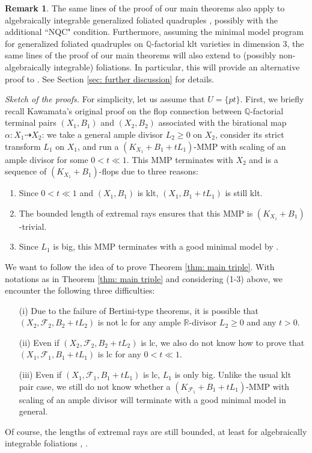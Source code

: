 \documentclass[11pt]{amsart}
\numberwithin{equation}{section}
\newcommand{\Qq}{\mathbb{Q}}
\newcommand{\Rr}{\mathbb{R}}
\newcommand{\Ff}{\mathcal{F}}
\theoremstyle{definition}
\theoremstyle{definition}
\newtheorem{rem}[thm]{Remark}
\theoremstyle{definition}
\begin{document}
\begin{rem}
The same lines of the proof of our main theorems also apply to algebraically integrable generalized foliated quadruples \cite[Definition 1.2]{LLM23}, possibly with the additional ``NQC" condition. Furthermore, assuming the minimal model program for generalized foliated quadruples on $\Qq$-factorial klt varieties in dimension 3, the same lines of the proof of our main theorems will also extend to (possibly non-algebraically integrable) foliations. In particular, this will provide an alternative proof to \cite[Theorem 1.1]{JV23}. See Section \ref{sec: further discussion} for details. 
\end{rem}



\medskip

\noindent\textit{Sketch of the proofs.} For simplicity, let us assume that $U=\{pt\}$. First, we briefly recall Kawamata's original proof \cite[Theorem 1]{Kaw08} on the flop connection between $\Qq$-factorial terminal pairs $(X_1,B_1)$ and $(X_2,B_2)$ associated with the birational map $\alpha: X_1\dashrightarrow X_2$: we take a general ample divisor $L_2\geq 0$ on $X_2$, consider its strict transform $L_1$ on $X_1$, and run a $(K_{X_1}+B_1+tL_1)$-MMP with scaling of an ample divisor for some $0<t\ll 1$. This MMP terminates with $X_2$ and is a sequence of $(K_{X_1}+B_1)$-flops due to three reasons: 
\begin{enumerate} 
\item Since $0<t\ll 1$ and $(X_1,B_1)$ is klt, $(X_1,B_1+tL_1)$ is still klt. 
\item The bounded length of extremal rays ensures that this MMP is $(K_{X_1}+B_1)$-trivial. 
\item Since $L_1$ is big, this MMP terminates with a good minimal model by \cite{BCHM10}. \end{enumerate} 
We want to follow the idea of \cite[Theorem 1]{Kaw08} to prove Theorem \ref{thm: main triple}. With notations as in Theorem \ref{thm: main triple} and considering (1-3) above, we encounter the following three difficulties: 
\begin{itemize} 
\item[(i)] Due to the failure of Bertini-type theorems, it is possible that $(X_2,\Ff_2,B_2+tL_2)$ is not lc for any ample $\Rr$-divisor $L_2\geq 0$ and any $t>0$. \item[(ii)] Even if $(X_2,\Ff_2,B_2+tL_2)$ is lc, we also do not know how to prove that $(X_1,\Ff_1,B_1+tL_1)$ is lc for any $0<t\ll 1$. \item[(iii)] Even if $(X_1,\Ff_1,B_1+tL_1)$ is lc, $L_1$ is only big. Unlike the usual klt pair case, we still do not know whether a $(K_{\Ff_1}+B_1+tL_1)$-MMP with scaling of an ample divisor will terminate with a good minimal model in general. 
\end{itemize}
Of course, the lengths of extremal rays are still bounded, at least for algebraically integrable foliations \cite[Theorem 3.9]{ACSS21}, \cite[Theorem 2.2.1]{CHLX23}.
\end{document}
